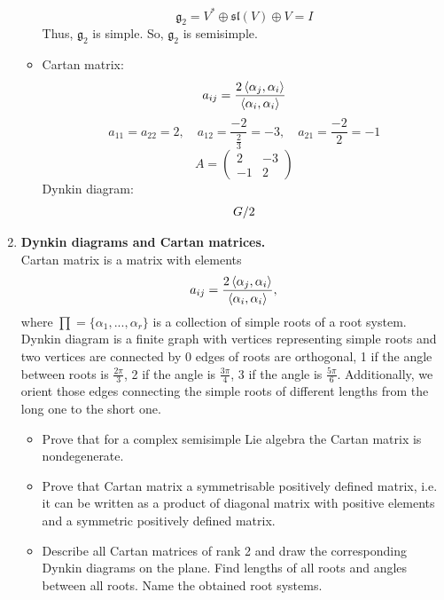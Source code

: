\documentclass[12pt]{article}
\def\row#1/#2!{#1_{\IfStrEq{#2}{}{n}{#2}} & \dynkin{#1}{#2}\\}
\newcommand{\tble}[1]{
   \renewcommand*\do[1]{\row##1!}
   \[
      \begin{array}{ll}\docsvlist{#1}\end{array}
   \]
}
\theoremstyle{definition}
\begin{document}
\begin{enumerate}
\begin{itemize}
\begin{equation}
            \mathfrak{g}_2=V^*\oplus\mathfrak{sl}(V)\oplus V=I
        \end{equation}
        Thus, $\mathfrak{g}_2$ is simple. So, $\mathfrak{g}_2$ is semisimple.
        \item Cartan matrix:
        \begin{equation}
            a_{ij}=\frac{2\braket{\alpha_j,\alpha_i}}{\braket{\alpha_i,\alpha_i}}
        \end{equation}
        \begin{equation}
            a_{11}=a_{22}=2,\quad a_{12}=\frac{-2}{\frac{2}{3}}=-3,\quad a_{21}=\frac{-2}{2}=-1
        \end{equation}
        \begin{equation}
            \boxed{A=\begin{pmatrix}
                2 & -3\\
                -1 & 2
            \end{pmatrix}}
        \end{equation}
        Dynkin diagram: \tble{G/2}
    \end{itemize}
    \item \textbf{Dynkin diagrams and Cartan matrices.}\\
    Cartan matrix is a matrix with elements
    \begin{equation}
        a_{ij}=\frac{2\braket{\alpha_j,\alpha_i}}{\braket{\alpha_i,\alpha_i}},
    \end{equation}
    where $\prod=\{\alpha_1,...,\alpha_r\}$ is a collection of simple roots of a root system. Dynkin diagram is a finite graph with vertices representing simple roots and two vertices are connected by 0 edges of roots are orthogonal, 1 if the angle between roots is $\frac{2\pi}{3}$, 2 if the angle is $\frac{3\pi}{4}$, 3 if the angle is $\frac{5\pi}{6}$. Additionally, we orient those edges connecting the simple roots of different lengths from the long one to the short one.
    \begin{itemize}
        \item Prove that for a complex semisimple Lie algebra the Cartan matrix is nondegenerate.
        \item Prove that Cartan matrix a symmetrisable positively defined matrix, i.e. it can be written as a product of diagonal matrix with positive elements and a symmetric positively defined matrix.
        \item Describe all Cartan matrices of rank 2 and draw the corresponding Dynkin diagrams on the plane. Find lengths of all roots and angles between all roots. Name the obtained root systems.

\end{itemize}
\end{enumerate}
\end{document}
